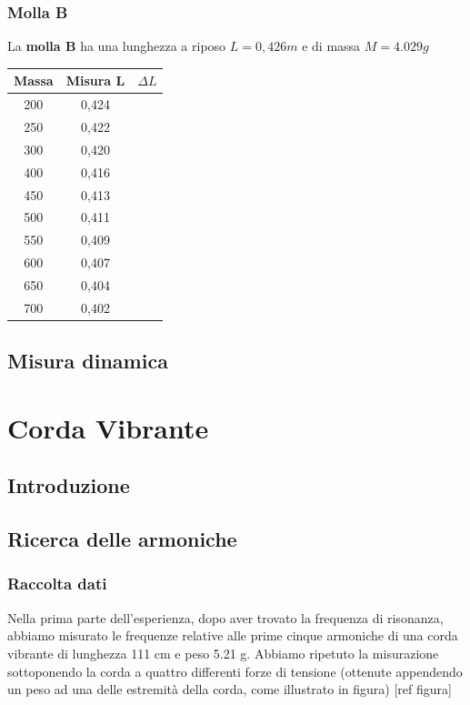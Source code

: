 \documentclass[a4paper,10pt]{report}
\begin{document}
\subsection*{Molla B}
La \textbf{molla B} ha una lunghezza a riposo $L=0,426 m$ e di massa $M=4.029 g$\\
\begin{tabular}{c|c|c}
Massa & Misura L & $\Delta L$ \\
\midrule
200 & 0,424 &\\
250 & 0,422 & \\
300 & 0,420 & \\
400 & 0,416 & \\
450 &  0,413 & \\
500 & 0,411 & \\
550 & 0,409 &\\
600 & 0,407 &\\
650 & 0,404 &\\
700 & 0,402 &\\
\end{tabular}

\section{Misura dinamica}

\chapter{Corda Vibrante}

\section{Introduzione}

\section{Ricerca delle armoniche}

\subsection{Raccolta dati}

Nella prima parte dell'esperienza, dopo aver trovato la frequenza di risonanza, abbiamo misurato le frequenze relative alle prime cinque armoniche di una corda vibrante di lunghezza 111 cm e peso 5.21 g. Abbiamo ripetuto la misurazione sottoponendo la corda a quattro differenti forze di tensione (ottenute appendendo un peso ad una delle estremità della corda, come illustrato in figura)
[ref figura]\\
\end{document}
